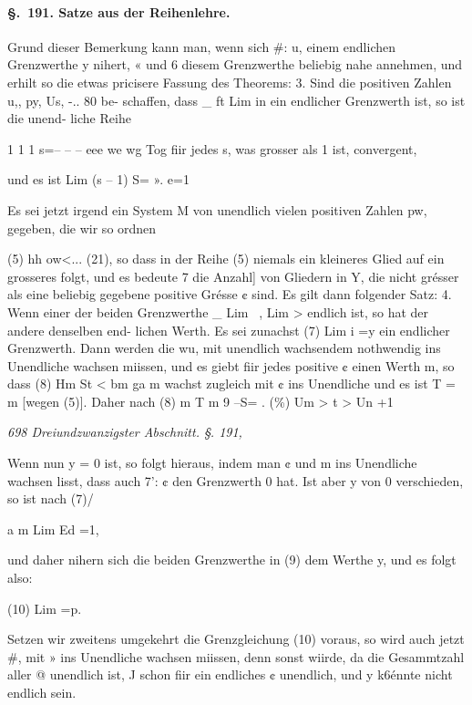 \documentclass[12pt,a4paper]{article}
\theoremstyle{plain}
\theoremstyle{definition}
\begin{document}
\paragraph{\S.~191. Satze aus der Reihenlehre.}


Grund dieser Bemerkung kann man, wenn sich \#: u, einem endlichen Grenzwerthe y nihert, « und 6 diesem Grenzwerthe beliebig nahe annehmen, und erhilt so die etwas pricisere Fassung des Theorems: 3. Sind die positiven Zahlen u,, py, Us, -.. 80 be- schaffen, dass \_ ft Lim in ein endlicher Grenzwerth ist, so ist die unend- liche Reihe

1 1 1 s=-- -- -- eee we wg Tog fiir jedes s, was grosser als 1 ist, convergent,

und es ist Lim (s -- 1) S= ». e=1

Es sei jetzt irgend ein System M von unendlich vielen positiven Zahlen pw, gegeben, die wir so ordnen

(5) hh ow<... (21), so dass in der Reihe (5) niemals ein kleineres Glied auf ein grosseres folgt, und es bedeute 7 die Anzahl] von Gliedern in Y, die nicht grésser als eine beliebig gegebene positive Grésse ¢ sind. Es gilt dann folgender Satz: 4. Wenn einer der beiden Grenzwerthe \_ Lim ~, Lim > endlich ist, so hat der andere denselben end- lichen Werth. Es sei zunachst (7) Lim i =y ein endlicher Grenzwerth. Dann werden die wu, mit unendlich wachsendem  nothwendig ins Unendliche wachsen miissen, und es giebt fiir jedes positive ¢ einen Werth m, so dass (8) Hm St < bm ga m wachst zugleich mit ¢ ins Unendliche und es ist T = m [wegen (5)]. Daher nach (8) m T m 9 --S= . (\%) Um > t > Un +1

\vspace{0.5\baselineskip}\noindent\textit{698 Dreiundzwanzigster Abschnitt. §. 191,}\par

Wenn nun y = 0 ist, so folgt hieraus, indem man ¢ und m ins Unendliche wachsen lisst, dass auch 7': ¢ den Grenzwerth 0 hat. Ist aber y von 0 verschieden, so ist nach (7)/

a m Lim Ed =1,

und daher nihern sich die beiden Grenzwerthe in (9) dem Werthe y, und es folgt also:

(10) Lim =p.

Setzen wir zweitens umgekehrt die Grenzgleichung (10) voraus, so wird auch jetzt \#, mit » ins Unendliche wachsen miissen, denn sonst wiirde, da die Gesammtzahl aller @ unendlich ist, J schon fiir ein endliches ¢ unendlich, und y k6énnte nicht endlich sein.
\end{document}
